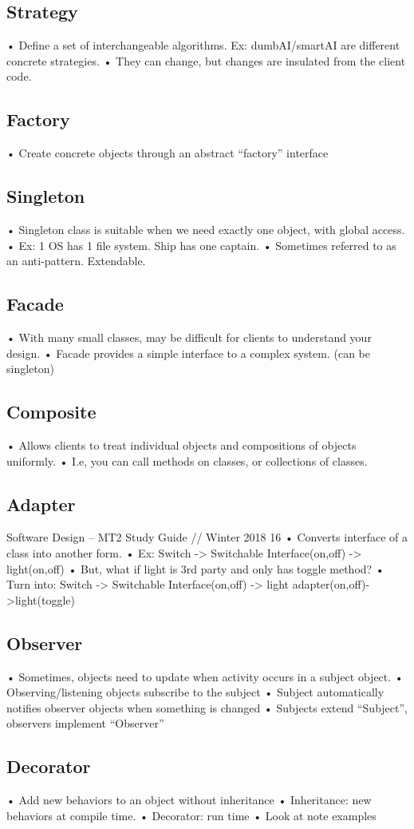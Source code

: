 \documentclass[11pt]{article}
\begin{document}
{\subsection{Strategy}
• Define a set of interchangeable algorithms. Ex: dumbAI/smartAI are different concrete strategies.
• They can change, but changes are insulated from the client code.
\subsection{Factory}
• Create concrete objects through an abstract “factory” interface
\subsection{Singleton}
• Singleton class is suitable when we need exactly one object, with global access.
• Ex: 1 OS has 1 file system. Ship has one captain.
• Sometimes referred to as an anti-pattern. Extendable.
\subsection{Facade}
• With many small classes, may be difficult for clients to understand your design.
• Facade provides a simple interface to a complex system. (can be singleton)
\subsection{Composite}
• Allows clients to treat individual objects and compositions of objects uniformly.
• I.e, you can call methods on classes, or collections of classes.
\subsection{Adapter}
Software Design – MT2 Study Guide // Winter 2018 16
• Converts interface of a class into another form.
• Ex: Switch -> Switchable Interface(on,off) -> light(on,off)
• But, what if light is 3rd party and only has toggle method?
• Turn into: Switch -> Switchable Interface(on,off) -> light adapter(on,off)->light(toggle)
\subsection{Observer}
• Sometimes, objects need to update when activity occurs in a subject object.
• Observing/listening objects subscribe to the subject
• Subject automatically notifies observer objects when something is changed
• Subjects extend “Subject”, observers implement “Observer”
\subsection{Decorator}
• Add new behaviors to an object without inheritance
• Inheritance: new behaviors at compile time.
• Decorator: run time
• Look at note examples
}
\end{document}
